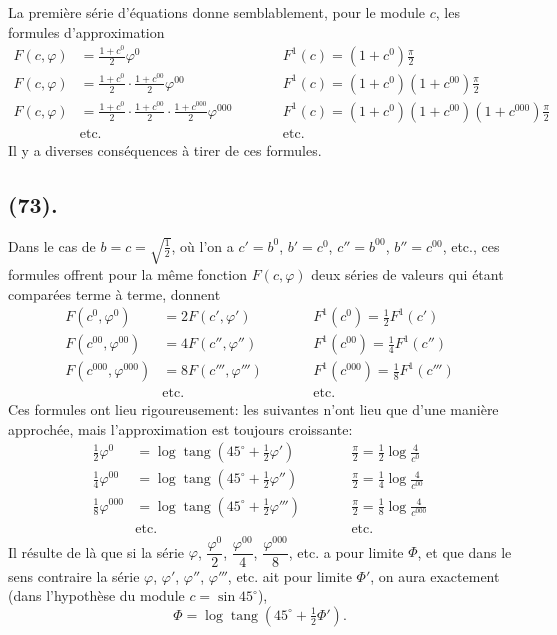\documentclass{article}
\begin{document}
La première série d'équations donne semblablement, pour le module $c$, les formules d'approximation
\[ \begin{aligned} F(c,\varphi)&=\frac{1+c^{0}}{2}\varphi^{0} &\qquad& F^{1}(c)=(1+c^{0})\frac{\pi}{2}\\ F(c,\varphi)&=\frac{1+c^{0}}{2}\cdot\frac{1+c^{00}}{2}\varphi^{00} && F^{1}(c)=(1+c^{0})(1+c^{00})\frac{\pi}{2}\\ F(c,\varphi)&=\frac{1+c^{0}}{2}\cdot\frac{1+c^{00}}{2}\cdot\frac{1+c^{000}}{2}\varphi^{000} && F^{1}(c)=(1+c^{0})(1+c^{00})(1+c^{000})\frac{\pi}{2}\\ &\text{etc.} && \text{etc.} \end{aligned} \]
Il y a diverses conséquences à tirer de ces formules.

\subsection*{(73).}

Dans le cas de $b=c=\sqrt{\frac{1}{2}}$, où l'on a $c'=b^{0}$, $b'=c^{0}$, $c''=b^{00}$, $b''=c^{00}$, etc., ces formules offrent pour la même fonction $F(c,\varphi)$ deux séries de valeurs qui étant comparées terme à terme, donnent
\[ \begin{aligned} F(c^{0},\varphi^{0})&=2F(c',\varphi') &\qquad& F^{1}(c^{0})=\tfrac{1}{2}F^{1}(c')\\ F(c^{00},\varphi^{00})&=4F(c'',\varphi'') && F^{1}(c^{00})=\tfrac{1}{4}F^{1}(c'')\\ F(c^{000},\varphi^{000})&=8F(c''',\varphi''') && F^{1}(c^{000})=\tfrac{1}{8}F^{1}(c''')\\ &\text{etc.} && \text{etc.} \end{aligned} \]
Ces formules ont lieu rigoureusement: les suivantes n'ont lieu que d'une manière approchée, mais l'approximation est toujours croissante:
\[ \begin{aligned} \tfrac{1}{2}\varphi^{0}&=\log\operatorname{tang}(45^{\circ}+\tfrac{1}{2}\varphi') &\qquad& \frac{\pi}{2}=\tfrac{1}{2}\log\frac{4}{c^{0}}\\ \tfrac{1}{4}\varphi^{00}&=\log\operatorname{tang}(45^{\circ}+\tfrac{1}{2}\varphi'') && \frac{\pi}{2}=\tfrac{1}{4}\log\frac{4}{c^{00}}\\ \tfrac{1}{8}\varphi^{000}&=\log\operatorname{tang}(45^{\circ}+\tfrac{1}{2}\varphi''') && \frac{\pi}{2}=\tfrac{1}{8}\log\frac{4}{c^{000}}\\ &\text{etc.} && \text{etc.} \end{aligned} \]
Il résulte de là que si la série $\varphi$, $\dfrac{\varphi^{0}}{2}$, $\dfrac{\varphi^{00}}{4}$, $\dfrac{\varphi^{000}}{8}$, etc. a pour limite $\Phi$, et que dans le sens contraire la série $\varphi$, $\varphi'$, $\varphi''$, $\varphi'''$, etc. ait pour limite $\Phi'$, on aura exactement (dans l'hypothèse du module $c=\sin45^{\circ}$),
\[ \Phi=\log\operatorname{tang}(45^{\circ}+\tfrac{1}{2}\Phi'). \]
\end{document}

